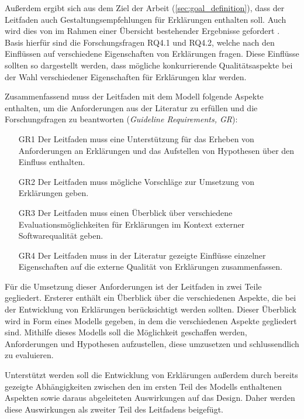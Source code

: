 Außerdem ergibt sich aus dem Ziel der Arbeit (\autoref{sec:goal_definition}), dass der Leitfaden auch Gestaltungsempfehlungen für Erklärungen enthalten soll. Auch wird dies von \citeauthor{waa_evaluating_2021} im Rahmen einer Übersicht bestehender Ergebnisse gefordert \cite{waa_evaluating_2021}. Basis hierfür sind die Forschungsfragen RQ4.1 und RQ4.2, welche nach den Einflüssen auf verschiedene Eigenschaften von Erklärungen fragen. Diese Einflüsse sollten so dargestellt werden, dass mögliche konkurrierende Qualitätsaspekte bei der Wahl verschiedener Eigenschaften für Erklärungen klar werden.

\smallskip

Zusammenfassend muss der Leitfaden mit dem Modell folgende Aspekte enthalten, um die Anforderungen aus der Literatur zu erfüllen und die Forschungsfragen zu beantworten (\textit{Guideline Requirements, GR}):

\begin{enumerate}
    \item[GR1] Der Leitfaden muss eine Unterstützung für das Erheben von Anforderungen an Erklärungen und das Aufstellen von Hypothesen über den Einfluss enthalten.
    \item[GR2] Der Leitfaden muss mögliche Vorschläge zur Umsetzung von Erklärungen geben.
    \item[GR3] Der Leitfaden muss einen Überblick über verschiedene Evaluationsmöglichkeiten für Erklärungen im Kontext externer Softwarequalität geben.
    \item[GR4] Der Leitfaden muss in der Literatur gezeigte Einflüsse einzelner Eigenschaften auf die externe Qualität von Erklärungen zusammenfassen.
\end{enumerate}

\bigskip

Für die Umsetzung dieser Anforderungen ist der Leitfaden in zwei Teile gegliedert. Ersterer enthält ein Überblick über die verschiedenen Aspekte, die bei der Entwicklung von Erklärungen berücksichtigt werden sollten. Dieser Überblick wird in Form eines Modells gegeben, in dem die verschiedenen Aspekte gegliedert sind. Mithilfe dieses Modells soll die Möglichkeit geschaffen werden, Anforderungen und Hypothesen aufzustellen, diese umzusetzen und schlussendlich zu evaluieren.

Unterstützt werden soll die Entwicklung von Erklärungen außerdem durch bereits gezeigte Abhängigkeiten zwischen den im ersten Teil des Modells enthaltenen Aspekten sowie daraus abgeleiteten Auswirkungen auf das Design. Daher werden diese Auswirkungen als zweiter Teil des Leitfadens beigefügt.

